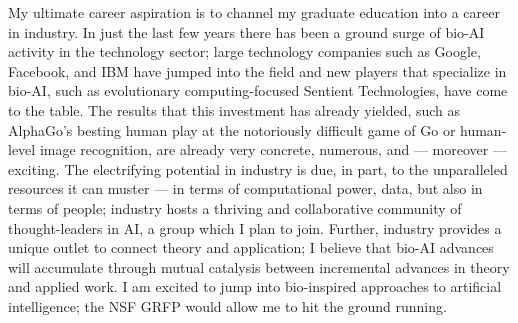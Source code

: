 \documentclass[12pt]{book}
\begin{document}
My ultimate career aspiration is to channel my graduate education into a career in industry. In just the last few years there has been a ground surge of bio-AI activity in the technology sector; large technology companies such as Google, Facebook, and IBM have jumped into the field and new players that specialize in bio-AI, such as evolutionary computing-focused Sentient Technologies, have come to the table. The results that this investment has already yielded, such as AlphaGo's besting human play at the notoriously difficult game of Go or human-level image recognition, are already very concrete, numerous, and --- moreover --- exciting. The electrifying potential in industry is due, in part, to the unparalleled resources it can muster --- in terms of computational power, data, but also in terms of people; industry hosts a thriving and collaborative community of thought-leaders in AI, a group which I plan to join. Further, industry provides a unique outlet to connect theory and application; I believe that bio-AI advances will accumulate through mutual catalysis between incremental advances in theory and applied work. I am excited to jump into bio-inspired approaches to artificial intelligence; the NSF GRFP would allow me to hit the ground running.
\end{document}
